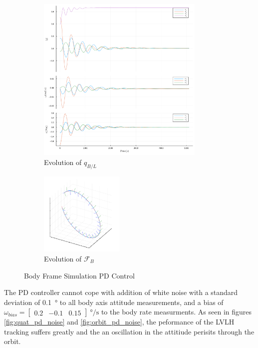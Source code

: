 \documentclass{article}
\begin{document}
\begin{figure}[H]
\centering
	\begin{subfigure}[b]{0.6\textwidth}
		\centering
		\includegraphics[width=8cm]{images/pd_perfect_attitude_lvlh.png}
		\caption{Evolution of $q_{B/L}$}
		\label{fig:quat_pd_perfect}
	\end{subfigure}
	\begin{subfigure}[b]{0.3\textwidth}
		\centering
		\includegraphics[width=4cm]{images/pd_perfect_orbit_0s_to_5100s.png}
		\caption{Evolution of $\mathcal{F}_{B}$}
		\label{fig:orbit_pd_perfect}
	\end{subfigure}
	\caption{Body Frame Simulation PD Control}
\end{figure}

The PD controller cannot cope with addition of white noise with a standard deviation of \SI{0.1}{\degree} to all body axis attitude measurements, and a bias of $\omega_{bias} = [\begin{matrix} 0.2 & -0.1 & 0.15\end{matrix}] \SI{}{\degree/\second}$ to the body rate measurments. As seen in figures \ref{fig:quat_pd_noise} and \ref{fig:orbit_pd_noise}, the peformance of the LVLH tracking suffers greatly and the an oscillation in the attitiude perisits through the orbit.
\end{document}
